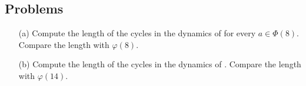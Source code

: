 \vspace*{0.5in}

\subsection{Problems}
\vspace{0.1in}

\begin{problem}\label{Problem 10.1}\hfill
\begin{itemize}
\item[(a)] Compute the length of the cycles in the dynamics of  for every $a \in \Phi(8)$. Compare the length with $\varphi(8)$.
\item[(b)] Compute the length of the cycles in the dynamics of . Compare the length with $\varphi(14)$.
\end{itemize}
\end{problem}